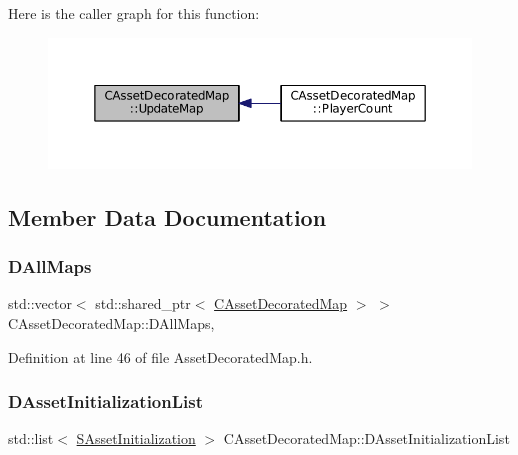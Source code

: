 Here is the caller graph for this function\+:\nopagebreak
\begin{figure}[H]
\begin{center}
\leavevmode
\includegraphics[width=350pt]{classCAssetDecoratedMap_a7b594b6bef2eed8bbb0e4e4e6b855903_icgraph}
\end{center}
\end{figure}


\subsection{Member Data Documentation}
\hypertarget{classCAssetDecoratedMap_a32cdd80c7e9d31d8ce5397dd6d61dc4b}{}\label{classCAssetDecoratedMap_a32cdd80c7e9d31d8ce5397dd6d61dc4b} 
\subsubsection{\texorpdfstring{D\+All\+Maps}{DAllMaps}}
{\footnotesize\ttfamily std\+::vector$<$ std\+::shared\+\_\+ptr$<$ \hyperlink{classCAssetDecoratedMap}{C\+Asset\+Decorated\+Map} $>$ $>$ C\+Asset\+Decorated\+Map\+::\+D\+All\+Maps\hspace{0.3cm}{\ttfamily [static]}, {\ttfamily [protected]}}



Definition at line 46 of file Asset\+Decorated\+Map.\+h.

\hypertarget{classCAssetDecoratedMap_a2b7bf2e9a19a9173093cef32048608c2}{}\label{classCAssetDecoratedMap_a2b7bf2e9a19a9173093cef32048608c2} 
\subsubsection{\texorpdfstring{D\+Asset\+Initialization\+List}{DAssetInitializationList}}
{\footnotesize\ttfamily std\+::list$<$ \hyperlink{structCAssetDecoratedMap_1_1SAssetInitialization}{S\+Asset\+Initialization} $>$ C\+Asset\+Decorated\+Map\+::\+D\+Asset\+Initialization\+List\hspace{0.3cm}{\ttfamily [protected]}}



